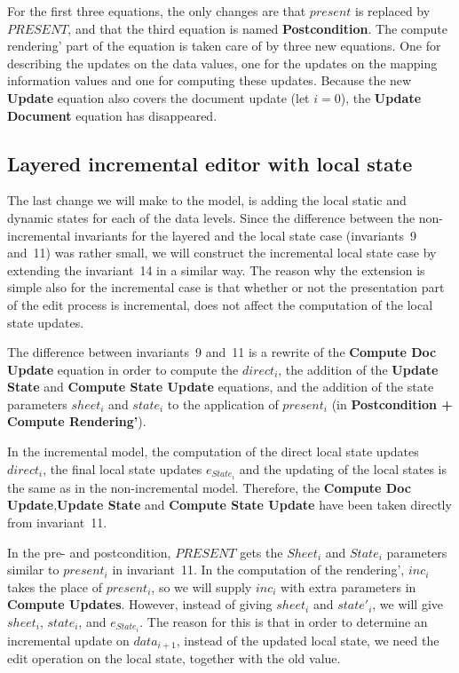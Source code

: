 \documentclass[twoside,epsf]{report}
\begin{document}
For the first three equations, the only changes are that $present$ is replaced by $PRESENT$, and that the third equation is named {\bf Postcondition}. The compute rendering' part of the equation is taken care of by three new equations. One for describing the updates on the data values, one for the updates on the mapping information values and one for computing these updates. Because the new {\bf Update} equation also covers the document update (let $i=0$), the {\bf Update Document} equation has disappeared.
\subsection{Layered incremental editor with local state}


The last change we will make to the model, is adding the local static and dynamic states for each of the data levels. Since the difference between the non-incremental invariants for the layered and the local state case (invariants~9 and~11) was rather small, we will construct the incremental local state case by extending the invariant~14 in a similar way. The reason why the extension is simple also for the incremental case is that whether or not the presentation part of the edit process is incremental, does not affect the computation of the local state updates.

The difference between invariants~9 and~11 is a rewrite of the {\bf Compute Doc Update} equation in order to compute the $direct_i$, the addition of the {\bf Update State} and {\bf Compute State Update} equations, and the addition of the state parameters $sheet_i$ and $state_i$ to the application of $present_i$ (in {\bf Postcondition + Compute Rendering'}).

In the incremental model, the computation of the direct local state updates $direct_i$, the final local state updates $e_{State_i}$ and the updating of the local states is the same as in the non-incremental model. Therefore, the {\bf Compute Doc Update},{\bf  Update State} and {\bf Compute State Update} have been taken directly from invariant~11. 

In the pre- and postcondition, $PRESENT$ gets the $Sheet_i$ and $State_i$ parameters similar to $present_i$ in invariant~11. In the computation of the rendering', $inc_i$ takes the place of $present_i$, so we will supply $inc_i$ with extra parameters in {\bf Compute Updates}. However, instead of giving $sheet_i$ and $state'_i$, we will give $sheet_i$, $state_i$, and $e_{State_i}$. The reason for this is that in order to determine an incremental update on $data_{i+1}$, instead of the updated local state, we need the edit operation on the local state, together with the old value.
\end{document}
